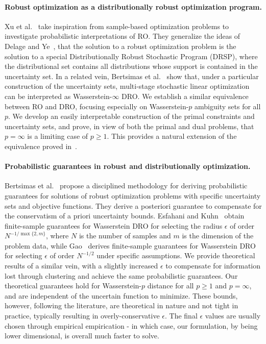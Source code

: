 \documentclass[12pt]{article}
\theoremstyle{thmstyleone}%
\theoremstyle{thmstyletwo}%
\theoremstyle{thmstylethree}%
\newcommand{\reviewChanges}{}
\begin{document}
\reviewChanges{\paragraph{Robust optimization as a distributionally robust optimization program.} Xu et al.~\cite{RO_DRO} take inspiration from sample-based optimization problems to investigate probabilistic interpretations of \gls{RO}. 
They generalize the ideas of Delage and Ye~\cite{dro_3}, that the solution to a robust optimization problem is the solution to a special Distributionally Robust Stochastic Program (DRSP), where the distributional set contains all distributions whose support is contained
in the uncertainty set.
In a related vein, Bertsimas et al.~\cite{wass-p-1} show that, under a particular construction of the uncertainty sets, multi-stage stochastic linear optimization can be interpreted as Wasserstein-$\infty$ \gls{DRO}. 
We establish a similar equivalence between \gls{RO} and \gls{DRO}, focusing especially on Wasserstein-$p$ ambiguity sets for all $p$. 
We develop an easily interpretable construction of the primal constraints and uncertainty sets, and prove, in view of both the primal and dual problems, that $p = \infty$ is a limiting case of $p \geq 1$. 
This provides a natural extension of the equivalence proved in~\cite[Proposition 3]{wass-p-1}.}

\paragraph{Probabilistic guarantees in robust and distributionally optimization.}
Bertsimas et al.~\cite{bertsimas_probabilistic} propose a disciplined methodology for deriving probabilistic guarantees for solutions of robust optimization problems with specific uncertainty sets and objective functions.
They derive a posteriori guarantee to compensate for the conservatism of a priori uncertainty bounds.
Esfahani and Kuhn~\cite{mohajerin_esfahani_data-driven_2018} obtain finite-sample guarantees for Wasserstein \gls{DRO} for selecting the radius $\epsilon$ of order $N^{-1/\max\{2,m\}}$, where $N$ is the number of samples and $m$ is the dimension of the problem data, while Gao~\cite{DBLP:gao2020} derives finite-sample guarantees for Wasserstein \gls{DRO} for selecting $\epsilon$ of order $N^{-1/2}$ under specific assumptions.
We provide theoretical results of a similar vein, with a slightly increased $\epsilon$ to compensate for information lost through clustering and achieve the same probabilistic guarantees.
\reviewChanges{Our theoretical guarantees hold for Wasserstein-$p$ distance for all $p\geq1$ and $p = \infty$, and are independent of the uncertain function to minimize. 
These bounds, however, following the literature, are theoretical in nature and not tight in practice, typically resulting in overly-conservative $\epsilon$.
The final $\epsilon$ values are usually chosen through empirical empirication - in which case, our formulation, by being lower dimensional, is overall much faster to solve.}
\end{document}
